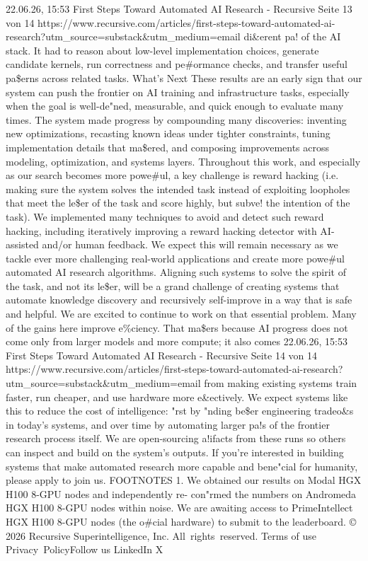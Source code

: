22.06.26, 15:53
First Steps Toward Automated AI Research - Recursive
Seite 13 von 14
https://www.recursive.com/articles/first-steps-toward-automated-ai-research?utm\_source=substack\&utm\_medium=email
di\&erent pa! of the AI stack. It had to reason about low-level implementation
choices, generate candidate kernels, run correctness and pe\#ormance
checks, and transfer useful pa\$erns across related tasks.
What’s Next
These results are an early sign that our system can push the frontier on AI
training and infrastructure tasks, especially when the goal is well-de"ned,
measurable, and quick enough to evaluate many times. The system made
progress by compounding many discoveries: inventing new optimizations,
recasting known ideas under tighter constraints, tuning implementation
details that ma\$ered, and composing improvements across modeling,
optimization, and systems layers.
Throughout this work, and especially as our search becomes more powe\#ul,
a key challenge is reward hacking (i.e. making sure the system solves the
intended task instead of exploiting loopholes that meet the le\$er of the task
and score highly, but subve! the intention of the task). We implemented many
techniques to avoid and detect such reward hacking, including iteratively
improving a reward hacking detector with AI-assisted and/or human feedback.
We expect this will remain necessary as we tackle ever more challenging
real-world applications and create more powe\#ul automated AI research
algorithms. Aligning such systems to solve the spirit of the task, and not its
le\$er, will be a grand challenge of creating systems that automate knowledge
discovery and recursively self-improve in a way that is safe and helpful.
We are excited to continue to work on that essential problem.
Many of the gains here improve e\%ciency. That ma\$ers because AI progress
does not come only from larger models and more compute; it also comes
22.06.26, 15:53
First Steps Toward Automated AI Research - Recursive
Seite 14 von 14
https://www.recursive.com/articles/first-steps-toward-automated-ai-research?utm\_source=substack\&utm\_medium=email
from making existing systems train faster, run cheaper, and use hardware
more e\&ectively. We expect systems like this to reduce the cost of intelligence:
"rst by "nding be\$er engineering tradeo\&s in today’s systems, and over
time by automating larger pa!s of the frontier research process itself.
We are open-sourcing a!ifacts from these runs so others can inspect
and build on the system’s outputs. If you’re interested in building systems
that make automated research more capable and bene"cial for humanity,
please apply to join us.
FOOTNOTES
1. We obtained our results on Modal HGX H100 8-GPU nodes and independently re-
con"rmed the numbers on Andromeda HGX H100 8-GPU nodes within noise. We
are awaiting access to PrimeIntellect HGX H100 8-GPU nodes (the o\#cial hardware)
to submit to the leaderboard.
© 2026 Recursive Superintelligence, Inc.
All rights reserved.
Terms
of use
Privacy PolicyFollow
us
LinkedIn
X

